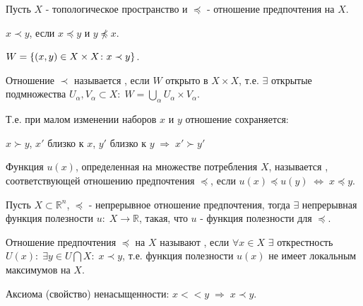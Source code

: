 Пусть $X$ - топологическое пространство и $\preceq$ - отношение предпочтения на $X$.

$x \prec y$, если $x \preceq y$ и $y \not \preceq x$.

$W = \left\{(x,y) \in X \times X\colon x \prec y\right\}$.

\begin{definition}\label{cha:1/def:5}
	Отношение $\prec$ называется , если $W$ открыто в $X \times X$, т.е. $\exists$ открытые подмножества $U_{\alpha}, V_{\alpha} \subset X: \; W = \underset{\alpha}{\bigcup} U_{\alpha} \times V_{\alpha}$.

	Т.е. при малом изменении наборов $x$ и $y$ отношение сохраняется:

	$x \succ y$, $x'$ близко к $x$, $y'$ близко к $y \; \Rightarrow \; x' \succ y'$
\end{definition}

\begin{definition}\label{cha:1/def:6}
	Функция $u(x)$, определенная на множестве потребления $X$, называется , соответствующей отношению предпочтения $\preceq$, если $u(x) \preceq u(y) \; \Leftrightarrow \; x \preceq y$.
\end{definition}

\begin{theorem}\label{cha:1/the:1}
	Пусть $X \subset \mathbb{R}^n$, $\preceq$ - непрерывное отношение предпочтения, тогда $\exists$ непрерывная функция полезности $u: \; X \to \mathbb{R}$, такая, что $u$ - функция полезности для $\preceq$.
\end{theorem}

\begin{definition}\label{cha:1/def:7}
	Отношение предпочтения $\preceq$ на $X$ называют , если $\forall x \in X$ $\exists$ открестность $U(x): \; \exists y \in U \bigcap X: \; x \prec y$, т.е. функция полезности $u(x)$ не имеет локальным максимумов на $X$.
\end{definition}

Аксиома (свойство) ненасыщенности: $x << y \; \Rightarrow \; x \prec y$.














